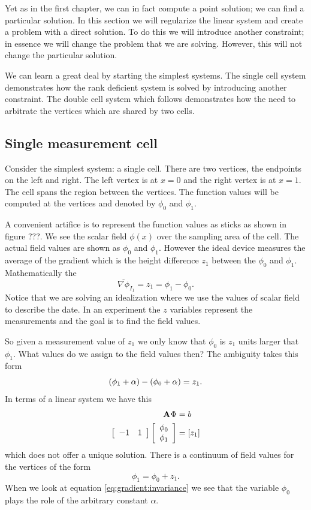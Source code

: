 Yet as in the first chapter, we can in fact compute a point solution; we can find a particular solution.  In this section we will regularize the linear system and create a problem with a direct solution. To do this we will introduce another constraint; in essence we will change the problem that we are solving. However, this will not change the particular solution.

We can learn a great deal by starting the simplest systems.  The single cell system demonstrates how the rank deficient system is solved by introducing another constraint. The double cell system which follows demonstrates how the need to arbitrate the vertices which are shared by two cells.

\subsection{Single measurement cell}
Consider the simplest system: a single cell. There are two vertices, the endpoints on the left and right. The left vertex is at $x=0$ and the right vertex is at $x=1$. The cell spans the region between the vertices. The function values will be computed at the vertices and denoted by $\phi_{0}$ and $\phi_{1}$.

A convenient artifice is to represent the function values as sticks as shown in figure ???. We see the scalar field $\phi(x)$ over the sampling area of the cell. The actual field values are shown as $\phi_{0}$ and $\phi_{1}$. However the ideal device measures the average of the gradient which is the height difference $z_{1}$ between the $\phi_{0}$ and $\phi_{1}$. Mathematically the 
\begin{equation}
  \overline{\nabla\phi}_{I_{1}}=z_{1}=\phi_{1}-\phi_{0}.
\end{equation}
Notice that we are solving an idealization where we use the values of scalar field to describe the date. In an experiment the $z$ variables represent the measurements and the goal is to find the field values.

So given a measurement value of $z_{1}$ we only know that $\phi_{0}$ is $z_{1}$ units larger that $\phi_{1}$. What values do we assign to the field values then? The ambiguity takes this form
\begin{equation}
  \left( \phi_{1}+\alpha \right)-\left( \phi_{0}+\alpha \right)=z_{1}.
\end{equation}
In terms of a linear system we have this
\begin{equation}
  \begin{split}
    \A{}\Phi&=b\\
    \mat{cc}{-1&1}\mat{c}{\phi_{0}\\\phi_{1}}&=\brac{z_{1}}
    \label{eq:gradient:1d:system}
  \end{split}
\end{equation}
which does not offer a unique solution. There is a continuum of field values for the vertices of the form
\begin{equation}
  \phi_{1}=\phi_{0}+z_{1}.
\end{equation}
When we look at equation \eqref{eq:gradient:invariance} we see that the variable $\phi_{0}$ plays the role of the arbitrary constant $\alpha$.

